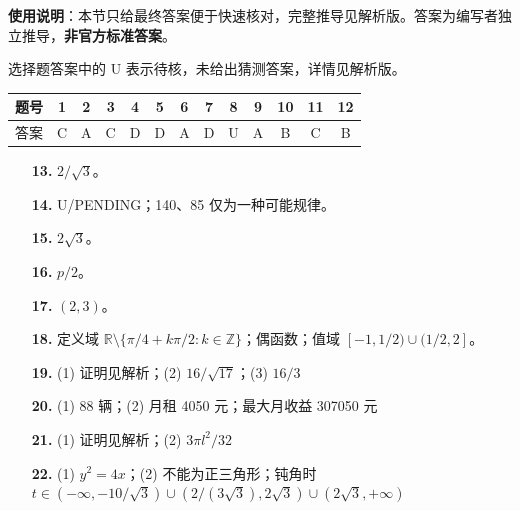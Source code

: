 
\begin{gknotice}
\textbf{使用说明}：本节只给最终答案便于快速核对，完整推导见解析版。答案为编写者独立推导，\textbf{非官方标准答案}。
\end{gknotice}

\begin{gknotice}
选择题答案中的 U 表示待核，未给出猜测答案，详情见解析版。
\end{gknotice}

\begin{center}\begin{tabular}{ccccccccccccc}
\toprule
题号 & 1 & 2 & 3 & 4 & 5 & 6 & 7 & 8 & 9 & 10 & 11 & 12 \\
\midrule
答案 & C & A & C & D & D & A & D & U & A & B & C & B \\
\bottomrule
\end{tabular}\end{center}

\begin{itemize}[leftmargin=2.6em]
  \item[\textbf{13.}] $2/\sqrt3$。
  \item[\textbf{14.}] U/PENDING；140、85 仅为一种可能规律。
  \item[\textbf{15.}] $2\sqrt3$。
  \item[\textbf{16.}] $p/2$。
\end{itemize}

\begin{itemize}[leftmargin=2.6em]
  \item[\textbf{17.}] $(2,3)$。
  \item[\textbf{18.}] 定义域 $\mathbb R\setminus\{\pi/4+k\pi/2:k\in\mathbb Z\}$；偶函数；值域 $[-1,1/2)\cup(1/2,2]$。
  \item[\textbf{19.}] (1) 证明见解析；(2) $16/\sqrt{17}$；(3) $16/3$
  \item[\textbf{20.}] (1) 88 辆；(2) 月租 4050 元；最大月收益 307050 元
  \item[\textbf{21.}] (1) 证明见解析；(2) $3\pi l^2/32$
  \item[\textbf{22.}] (1) $y^2=4x$；(2) 不能为正三角形；钝角时 $t\in(-\infty,-10/\sqrt3)\cup(2/(3\sqrt3),2\sqrt3)\cup(2\sqrt3,+\infty)$
\end{itemize}
